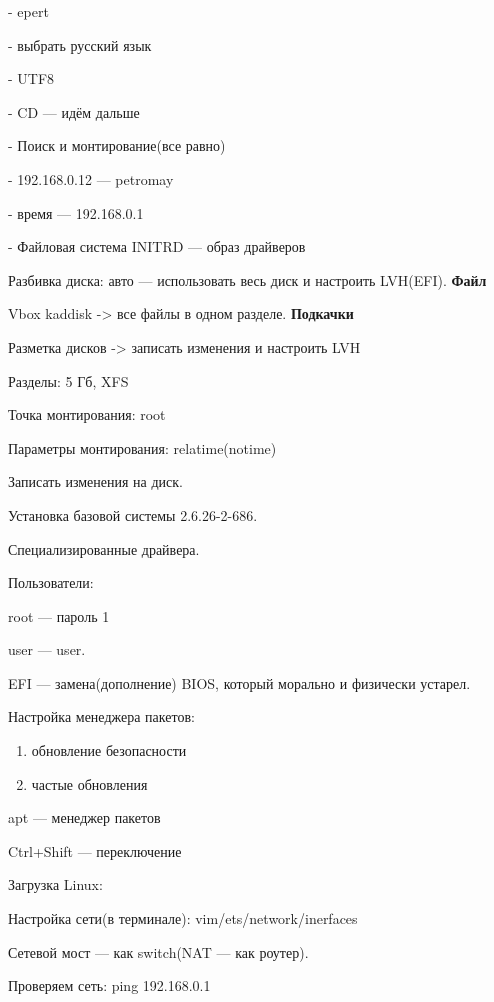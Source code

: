 \par 
- epert
\par 
- выбрать русский язык
\par 
- UTF8
\par 
- CD — идём дальше
\par 
- Поиск и монтирование(все равно)
\par 
- 192.168.0.12 — petromay
\par 
- время — 192.168.0.1 

\par 
- Файловая система INITRD — образ драйверов
\par Разбивка
диска: авто — использовать весь диск и
настроить LVH(EFI).  \textbf{Файл}
\par Vbox
kaddisk -> все файлы в одном разделе.                      
                         \textbf{Подкачки}
\par Разметка
дисков -> записать изменения и настроить LVH
\par 
Разделы: 5 Гб, XFS
\par 
Точка монтирования: root
\par 
Параметры монтирования: relatime(notime)
\par 
Записать изменения на диск.
\par 
Установка базовой системы 2.6.26-2-686.
\par 
Специализированные драйвера.
\par 
Пользователи:
\par 
root — пароль 1
\par 
user — user.
\par 
EFI — замена(дополнение) BIOS, который
морально и физически устарел.
\par 
Настройка менеджера пакетов:
\begin{enumerate}
	\item \par 
	обновление безопасности
	\item \par 
	частые обновления
\end{enumerate}
\par 
apt — менеджер пакетов
\par 
Ctrl+Shift — переключение
\par 
Загрузка Linux:
\par 
Настройка сети(в терминале):
vim/ets/network/inerfaces
\par 
Сетевой мост — как switch(NAT — как роутер).
\par 
Проверяем сеть: ping 192.168.0.1 

